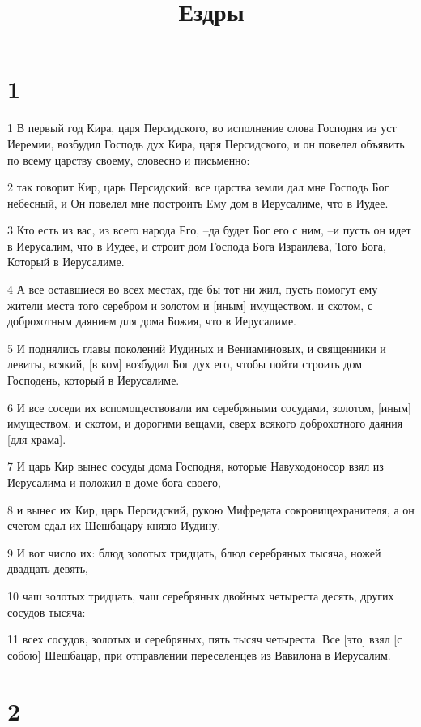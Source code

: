 

\title{Ездры}


\chapter{1}

\par 1 В первый год Кира, царя Персидского, во исполнение слова Господня из уст Иеремии, возбудил Господь дух Кира, царя Персидского, и он повелел объявить по всему царству своему, словесно и письменно:
\par 2 так говорит Кир, царь Персидский: все царства земли дал мне Господь Бог небесный, и Он повелел мне построить Ему дом в Иерусалиме, что в Иудее.
\par 3 Кто есть из вас, из всего народа Его, --да будет Бог его с ним, --и пусть он идет в Иерусалим, что в Иудее, и строит дом Господа Бога Израилева, Того Бога, Который в Иерусалиме.
\par 4 А все оставшиеся во всех местах, где бы тот ни жил, пусть помогут ему жители места того серебром и золотом и [иным] имуществом, и скотом, с доброхотным даянием для дома Божия, что в Иерусалиме.
\par 5 И поднялись главы поколений Иудиных и Вениаминовых, и священники и левиты, всякий, [в ком] возбудил Бог дух его, чтобы пойти строить дом Господень, который в Иерусалиме.
\par 6 И все соседи их вспомоществовали им серебряными сосудами, золотом, [иным] имуществом, и скотом, и дорогими вещами, сверх всякого доброхотного даяния [для храма].
\par 7 И царь Кир вынес сосуды дома Господня, которые Навуходоносор взял из Иерусалима и положил в доме бога своего, --
\par 8 и вынес их Кир, царь Персидский, рукою Мифредата сокровищехранителя, а он счетом сдал их Шешбацару князю Иудину.
\par 9 И вот число их: блюд золотых тридцать, блюд серебряных тысяча, ножей двадцать девять,
\par 10 чаш золотых тридцать, чаш серебряных двойных четыреста десять, других сосудов тысяча:
\par 11 всех сосудов, золотых и серебряных, пять тысяч четыреста. Все [это] взял [с собою] Шешбацар, при отправлении переселенцев из Вавилона в Иерусалим.

\chapter{2}

